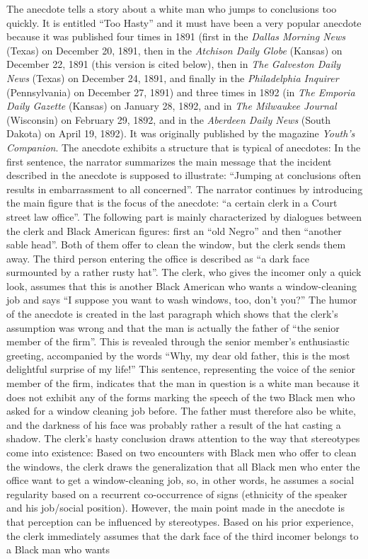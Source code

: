 The anecdote tells a story about a white man who jumps to conclusions too quickly. It is entitled “Too Hasty” and it must have been a very popular anecdote because it was published four times in 1891 (first in the \emph{Dallas Morning News} (Texas) on December 20, 1891, then in the\emph{ Atchison Daily Globe} (Kansas) on December 22, 1891 (this version is cited below), then in \emph{The Galveston Daily News} (Texas) on December 24, 1891, and finally in the \emph{Philadelphia Inquirer} (Pennsylvania) on December 27, 1891) and three times in 1892 (in \emph{The Emporia Daily Gazette} (Kansas) on January 28, 1892, and in \emph{The Milwaukee Journal} (Wisconsin) on February 29, 1892, and in the \emph{Aberdeen Daily News} (South Dakota) on April 19, 1892). It was originally published by the magazine \emph{Youth’s Companion}. The anecdote exhibits a structure that is typical of anecdotes: In the first sentence, the narrator summarizes the main message that the incident described in the anecdote is supposed to illustrate: “Jumping at conclusions often results in embarrassment to all concerned”. The narrator continues by introducing the main figure that is the focus of the anecdote: “a certain clerk in a Court street law office”. The following part is mainly characterized by dialogues between the clerk and Black American figures: first an “old Negro” and then “another sable head”. Both of them offer to clean the window, but the clerk sends them away. The third person entering the office is described as “a dark face surmounted by a rather rusty hat”. The clerk, who gives the incomer only a quick look, assumes that this is another Black American who wants a window-cleaning job and says “I suppose you want to wash windows, too, don’t you?” The humor of the anecdote is created in the last paragraph which shows that the clerk’s assumption was wrong and that the man is actually the father of “the senior member of the firm”. This is revealed through the senior member’s enthusiastic greeting, accompanied by the words “Why, my dear old father, this is the most delightful surprise of my life!” This sentence, representing the voice of the senior member of the firm, indicates that the man in question is a white man because it does not exhibit any of the forms marking the speech of the two Black men who asked for a window cleaning job before. The father must therefore also be white, and the darkness of his face was probably rather a result of the hat casting a shadow. The clerk’s hasty conclusion draws attention to the way that stereotypes come into existence: Based on two encounters with Black men who offer to clean the windows, the clerk draws the generalization that all Black men who enter the office want to get a window-cleaning job, so, in other words, he assumes a social regularity based on a recurrent co-occurrence of signs (ethnicity of the speaker and his job/social position). However, the main point made in the anecdote is that perception can be influenced by stereotypes. Based on his prior experience, the clerk immediately assumes that the dark face of the third incomer belongs to a Black man who wants 